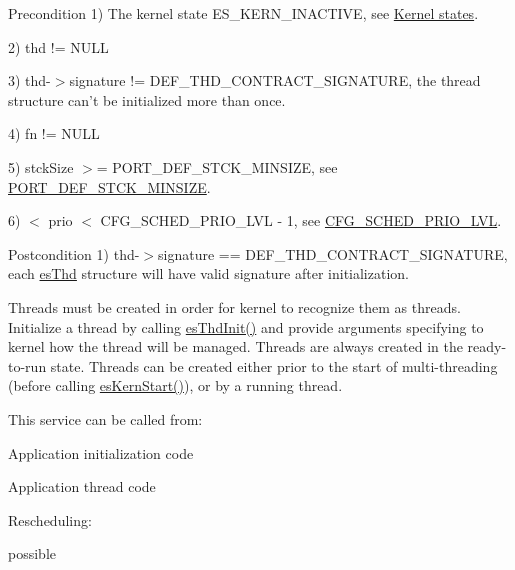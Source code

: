 \begin{DoxyPrecond}{Precondition}
1) {\ttfamily The kernel state E\-S\-\_\-\-K\-E\-R\-N\-\_\-\-I\-N\-A\-C\-T\-I\-V\-E}, see \hyperlink{states}{Kernel states}. 

2) {\ttfamily thd != N\-U\-L\-L} 

3) {\ttfamily thd-\/$>$signature != D\-E\-F\-\_\-\-T\-H\-D\-\_\-\-C\-O\-N\-T\-R\-A\-C\-T\-\_\-\-S\-I\-G\-N\-A\-T\-U\-R\-E}, the thread structure can't be initialized more than once. 

4) {\ttfamily fn != N\-U\-L\-L} 

5) {\ttfamily stck\-Size $>$= P\-O\-R\-T\-\_\-\-D\-E\-F\-\_\-\-S\-T\-C\-K\-\_\-\-M\-I\-N\-S\-I\-Z\-E}, see \hyperlink{group__template__cpu__intf_ga5a629fee11006b5b0b97f7cb7176efd4}{P\-O\-R\-T\-\_\-\-D\-E\-F\-\_\-\-S\-T\-C\-K\-\_\-\-M\-I\-N\-S\-I\-Z\-E}. 

6) { $<$ prio $<$ C\-F\-G\-\_\-\-S\-C\-H\-E\-D\-\_\-\-P\-R\-I\-O\-\_\-\-L\-V\-L -\/ 1}, see \hyperlink{group__template__kern__cfg_ga56bd89fe76f7fe22f3d8805bc3c68892}{C\-F\-G\-\_\-\-S\-C\-H\-E\-D\-\_\-\-P\-R\-I\-O\-\_\-\-L\-V\-L}. 
\end{DoxyPrecond}
\begin{DoxyPostcond}{Postcondition}
1) {\ttfamily thd-\/$>$signature == D\-E\-F\-\_\-\-T\-H\-D\-\_\-\-C\-O\-N\-T\-R\-A\-C\-T\-\_\-\-S\-I\-G\-N\-A\-T\-U\-R\-E}, each \hyperlink{structesThd}{es\-Thd} structure will have valid signature after initialization.
\end{DoxyPostcond}
Threads must be created in order for kernel to recognize them as threads. Initialize a thread by calling \hyperlink{group__kern__thd_gac91734f3ee867b519f59bf81cc7fde88}{es\-Thd\-Init()} and provide arguments specifying to kernel how the thread will be managed. Threads are always created in the {\ttfamily ready-\/to-\/run} state. Threads can be created either prior to the start of multi-\/threading (before calling \hyperlink{group__kern__general_ga0e7a0a6b9c02df58de0f98de0229a09d}{es\-Kern\-Start()}), or by a running thread. \begin{DoxyParagraph}{This service can be called from\-:}

\begin{DoxyItemize}
\item Application initialization code
\item Application thread code 
\end{DoxyItemize}
\end{DoxyParagraph}
\begin{DoxyParagraph}{Rescheduling\-:}

\begin{DoxyItemize}
\item possible 
\end{DoxyItemize}
\end{DoxyParagraph}
